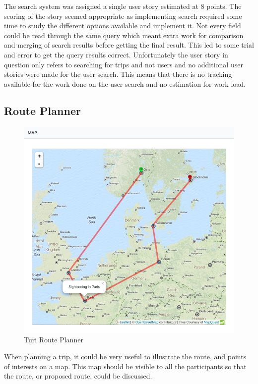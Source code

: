 \documentclass[a4paper]{article}
\begin{document}
\noindent
The search system was assigned a single user story estimated at 8 points. The scoring of the story seemed appropriate as implementing search required some time to study the different options available and implement it. Not every field could be read through the same query which meant extra work for comparison and merging of search results before getting the final result. This led to some trial and error to get the query results correct. Unfortunately the user story in question only refers to searching for trips and not users and no additional user stories were made for the user search. This means that there is no tracking available for the work done on the user search and no estimation for work load.


\subsection{Route Planner}

\begin{figure}[!h]
  \begin{center}
    \includegraphics[width=1\textwidth]{pictures/route_planning}
  \end{center}
\caption{Turi Route Planner}
\label{fig:route}
\end{figure}

\noindent
When planning a trip, it could be very useful to illustrate the route, and points of interests on a map. This map should be visible to all the participants so that the route, or proposed route, could be discussed.\\
\end{document}

